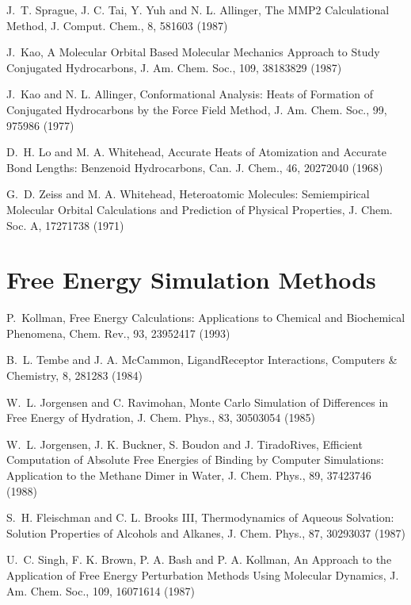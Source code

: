 \documentclass[letterpaper,11pt,english]{sphinxmanual}
\begin{document}
J. T. Sprague, J. C. Tai, Y. Yuh and N. L. Allinger, The MMP2 Calculational Method, J. Comput. Chem., 8, 581\sphinxhyphen{}603 (1987)

J. Kao, A Molecular Orbital Based Molecular Mechanics Approach to Study Conjugated Hydrocarbons, J. Am. Chem. Soc., 109, 3818\sphinxhyphen{}3829 (1987)

J. Kao and N. L. Allinger, Conformational Analysis: Heats of Formation of Conjugated Hydrocarbons by the Force Field Method, J. Am. Chem. Soc., 99, 975\sphinxhyphen{}986 (1977)

D. H. Lo and M. A. Whitehead, Accurate Heats of Atomization and Accurate Bond Lengths: Benzenoid Hydrocarbons, Can. J. Chem., 46, 2027\sphinxhyphen{}2040 (1968)

G. D. Zeiss and M. A. Whitehead, Hetero\sphinxhyphen{}atomic Molecules: Semi\sphinxhyphen{}empirical Molecular Orbital Calculations and Prediction of Physical Properties, J. Chem. Soc. A, 1727\sphinxhyphen{}1738 (1971)


\section{Free Energy Simulation Methods}
\label{\detokenize{text/references:free-energy-simulation-methods}}
P. Kollman, Free Energy Calculations: Applications to Chemical and Biochemical Phenomena, Chem. Rev., 93, 2395\sphinxhyphen{}2417 (1993)

B. L. Tembe and J. A. McCammon, Ligand\sphinxhyphen{}Receptor Interactions, Computers \& Chemistry, 8, 281\sphinxhyphen{}283 (1984)

W. L. Jorgensen and C. Ravimohan, Monte Carlo Simulation of Differences in Free Energy of Hydration, J. Chem. Phys., 83, 3050\sphinxhyphen{}3054 (1985)

W. L. Jorgensen, J. K. Buckner, S. Boudon and J. Tirado\sphinxhyphen{}Rives, Efficient Computation of Absolute Free Energies of Binding by Computer Simulations:  Application to the Methane Dimer in Water, J. Chem. Phys., 89, 3742\sphinxhyphen{}3746 (1988)

S. H. Fleischman and C. L. Brooks III, Thermodynamics of Aqueous Solvation:  Solution Properties of Alcohols and Alkanes, J. Chem. Phys., 87, 3029\sphinxhyphen{}3037 (1987)

U. C. Singh, F. K. Brown, P. A. Bash and P. A. Kollman, An Approach to the Application of Free Energy Perturbation Methods Using Molecular Dynamics, J. Am. Chem. Soc., 109, 1607\sphinxhyphen{}1614 (1987)
\end{document}
